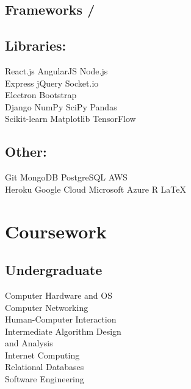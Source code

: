 \documentclass[]{deedy-resume-openfont}
\begin{document}
\begin{minipage}[t]{0.3\textwidth}
\subsection{Frameworks /}
\subsection{Libraries:}
\vspace{1mm}
React.js \textbullet{} AngularJS \textbullet{} Node.js \\
Express \textbullet{} jQuery \textbullet{} Socket.io \\
Electron \textbullet{} Bootstrap \\
\vspace{1mm}
Django \textbullet{} NumPy \textbullet{} SciPy \textbullet{} Pandas \\
Scikit-learn \textbullet{} Matplotlib \textbullet{} TensorFlow \\
\vspace{2mm}
\subsection{Other:}
Git \textbullet{} MongoDB \textbullet{} PostgreSQL \textbullet{} AWS \\
Heroku \textbullet{} Google Cloud \textbullet{} Microsoft Azure \textbullet{}
R \textbullet{} \LaTeX\ \\


\section{Coursework}
\subsection{Undergraduate}
Computer Hardware and OS \\
Computer Networking \\
Human-Computer Interaction \\
Intermediate Algorithm Design \\
\hspace{2mm}and Analysis \\
Internet Computing \\
Relational Databases \\
Software Engineering \\


\end{minipage}
\end{document}
